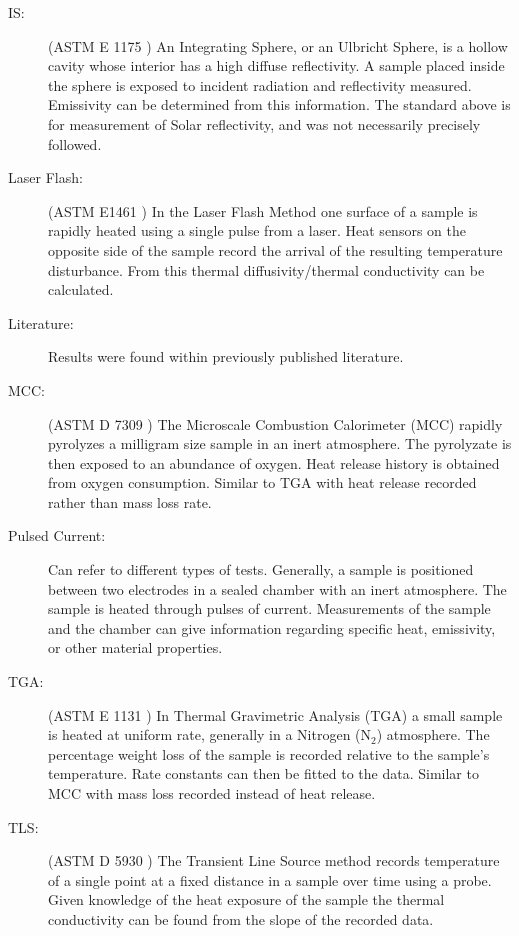 \begin{description}
\item[IS:] (ASTM E 1175 \cite{intgsphere}) An Integrating Sphere, or an Ulbricht Sphere, is a hollow cavity whose interior has a high diffuse reflectivity. A sample placed inside the sphere is exposed to incident radiation and reflectivity measured. Emissivity can be determined from this information. The standard above is for measurement of Solar reflectivity, and was not necessarily precisely followed.
\item[Laser Flash:] (ASTM E1461 \cite{laserflash}) In the Laser Flash Method one surface of a sample is rapidly heated using a single pulse from a laser. Heat sensors on the opposite side of the sample record the arrival of the resulting temperature disturbance. From this thermal diffusivity/thermal conductivity can be calculated.
\item[Literature:] Results were found within previously published literature.
\item[MCC:] (ASTM D 7309 \cite{microcc}) The Microscale Combustion Calorimeter (MCC)  rapidly pyrolyzes a milligram size sample in an inert atmosphere. The pyrolyzate is then exposed to an abundance of oxygen.  Heat release history is obtained from oxygen consumption. Similar to TGA with  heat release recorded rather than mass loss rate.
\item[Pulsed Current:] Can refer to different types of tests. Generally, a sample is positioned between two electrodes in a sealed chamber with an inert atmosphere. The sample is heated through pulses of current. Measurements of the sample and the chamber can give information regarding specific heat, emissivity, or other material properties.
\item[TGA:] (ASTM E 1131 \cite{thermalga}) In Thermal Gravimetric Analysis (TGA)  a small sample is heated at uniform rate, generally in a Nitrogen (N$_2$) atmosphere. The percentage weight loss of the sample is recorded relative to the sample's temperature. Rate constants can then be fitted to the data. Similar to MCC with mass loss recorded instead of heat release.
\item[TLS:] (ASTM D 5930 \cite{transline}) The Transient Line Source method records temperature of a single point at a fixed distance in a sample over time using a probe. Given knowledge of the heat exposure of the sample the thermal conductivity can be found from the slope of the recorded data.
\end{description}



\newpage

